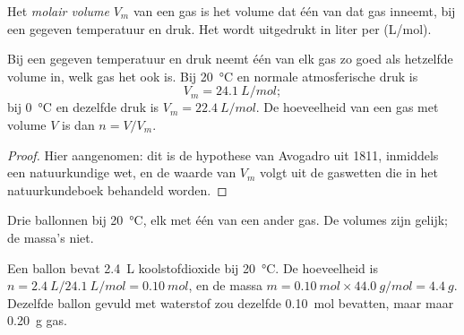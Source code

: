 \begin{definition}\label{def:g10:the-mole:molar-volume}
Het \emph{molair volume} $V_m$ van een gas is het
volume dat één  van dat gas inneemt, bij een gegeven temperatuur en
druk. Het wordt uitgedrukt in liter per  (\si{L/mol}).
\end{definition}

\begin{proposition}\label{prop:g10:the-mole:avogadro-law}
Bij een gegeven temperatuur en druk neemt één  van elk gas zo goed als
hetzelfde volume in, welk gas het ook is. Bij \qty{20}{\celsius} en
normale atmosferische druk is
\[
  V_m = \qty{24.1}{L/mol};
\]
bij \qty{0}{\celsius} en dezelfde druk is $V_m = \qty{22.4}{L/mol}$. De
hoeveelheid van een gas met volume $V$ is dan $n = V / V_m$.
\end{proposition}

\begin{proof}
Hier aangenomen: dit is de hypothese van Avogadro uit 1811, inmiddels een
natuurkundige wet, en de waarde van $V_m$ volgt uit de gaswetten die in
het natuurkundeboek behandeld worden.
\end{proof}

\begin{omfigure}

{\small Drie ballonnen bij \qty{20}{\celsius}, elk met één  van een
ander gas. De volumes zijn gelijk; de massa's niet.}
\end{omfigure}


\begin{example}\label{ex:g10:the-mole:balloon}
Een ballon bevat \qty{2.4}{L} koolstofdioxide bij \qty{20}{\celsius}.
De hoeveelheid is $n = \qty{2.4}{L} / \qty{24.1}{L/mol} = \qty{0.10}{mol}$,
en de massa $m = \qty{0.10}{mol} \times \qty{44.0}{g/mol} =
\qty{4.4}{g}$. Dezelfde ballon gevuld met waterstof zou dezelfde
\qty{0.10}{mol} bevatten, maar maar \qty{0.20}{g} gas.
\end{example}

